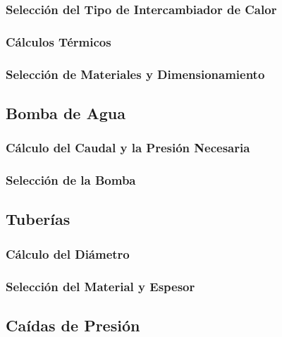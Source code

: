 \documentclass[11pt,a4paper]{article}  %
\begin{document}
\subsubsection{Selección del Tipo de Intercambiador de Calor}

\subsubsection{Cálculos Térmicos}

\subsubsection{Selección de Materiales y Dimensionamiento}

\subsection{Bomba de Agua}
\subsubsection{Cálculo del Caudal y la Presión Necesaria}

\subsubsection{Selección de la Bomba}

\subsection{Tuberías}
\subsubsection{Cálculo del Diámetro}

\subsubsection{Selección del Material y Espesor}

\subsection{Caídas de Presión}
\end{document}
